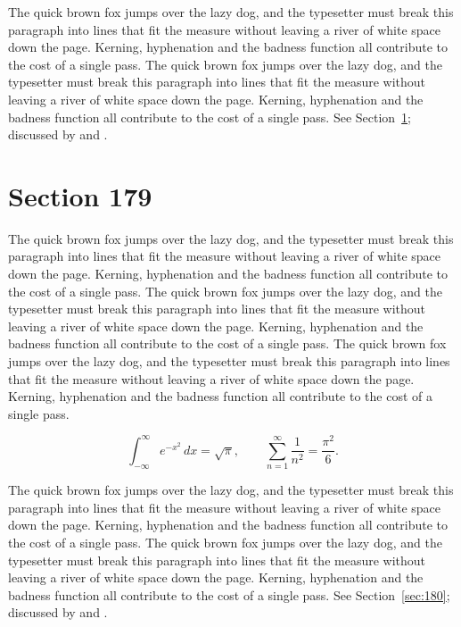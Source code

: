 \documentclass{article}
\begin{document}
The quick brown fox jumps over the lazy dog, and the typesetter must break this paragraph into lines that fit the measure without leaving a river of white space down the page. Kerning, hyphenation and the badness function all contribute to the cost of a single pass. The quick brown fox jumps over the lazy dog, and the typesetter must break this paragraph into lines that fit the measure without leaving a river of white space down the page. Kerning, hyphenation and the badness function all contribute to the cost of a single pass. 
See Section~\ref{sec:179}; discussed by \textcite{k4} and \textcite{l1}.
\section{Section 179}
\label{sec:179}
The quick brown fox jumps over the lazy dog, and the typesetter must break this paragraph into lines that fit the measure without leaving a river of white space down the page. Kerning, hyphenation and the badness function all contribute to the cost of a single pass. The quick brown fox jumps over the lazy dog, and the typesetter must break this paragraph into lines that fit the measure without leaving a river of white space down the page. Kerning, hyphenation and the badness function all contribute to the cost of a single pass. The quick brown fox jumps over the lazy dog, and the typesetter must break this paragraph into lines that fit the measure without leaving a river of white space down the page. Kerning, hyphenation and the badness function all contribute to the cost of a single pass. 

\begin{equation}\label{eq:179}
\int_{-\infty}^{\infty} e^{-x^{2}}\,dx = \sqrt{\pi}, \qquad
\sum_{n=1}^{\infty} \frac{1}{n^{2}} = \frac{\pi^{2}}{6}.
\end{equation}

The quick brown fox jumps over the lazy dog, and the typesetter must break this paragraph into lines that fit the measure without leaving a river of white space down the page. Kerning, hyphenation and the badness function all contribute to the cost of a single pass. The quick brown fox jumps over the lazy dog, and the typesetter must break this paragraph into lines that fit the measure without leaving a river of white space down the page. Kerning, hyphenation and the badness function all contribute to the cost of a single pass. 
See Section~\ref{sec:180}; discussed by \textcite{k5} and \textcite{l2}.
\end{document}
